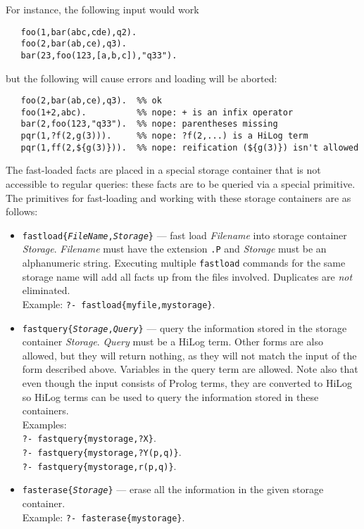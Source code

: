 For instance, the following input would work
\begin{verbatim}
   foo(1,bar(abc,cde),q2).
   foo(2,bar(ab,ce),q3).
   bar(23,foo(123,[a,b,c]),"q33").
\end{verbatim}
but the following will cause errors and loading will be aborted:
\begin{verbatim}
   foo(2,bar(ab,ce),q3).  %% ok
   foo(1+2,abc).          %% nope: + is an infix operator
   bar(2,foo(123,"q33").  %% nope: parentheses missing
   pqr(1,?f(2,g(3))).     %% nope: ?f(2,...) is a HiLog term
   pqr(1,ff(2,${g(3)})).  %% nope: reification (${g(3)}) isn't allowed
\end{verbatim}
The fast-loaded facts are placed in a special storage container that is not
accessible to regular queries: these facts are to be queried via a special
primitive. The primitives for fast-loading and working with these storage
containers are as follows:
\begin{itemize}
\item  \texttt{fastload\{{\it FileName\/},{\it Storage\/}\}} --- fast load
  \emph{Filename} into storage container \emph{Storage}. \emph{Filename}
  must have the extension \texttt{.P} and
  \emph{Storage} must be an alphanumeric string.
  Executing multiple \texttt{fastload} commands for the same storage name
  will add all facts up from the files involved.
  Duplicates are \emph{not} eliminated.
  \\
  Example: \texttt{?- fastload\{myfile,mystorage\}}. 
\item \texttt{fastquery\{{\it Storage\/},{\it Query\/}\}} --- query    
  the information stored in the storage container \emph{Storage}.
  \emph{Query} must be a HiLog term. Other forms are also allowed, but
  they will return nothing, as they will not match the input of the form
  described above. Variables in the query term are allowed.
  Note also that even though the input consists of Prolog terms, they are
  converted to HiLog so HiLog terms can be used to query the information
  stored in these containers.
  \\
  Examples:\\
  \hspace*{5mm}\texttt{?- fastquery\{mystorage,?X\}}. \\
  \hspace*{5mm}\texttt{?- fastquery\{mystorage,?Y(p,q)\}}. \\
  \hspace*{5mm}\texttt{?- fastquery\{mystorage,r(p,q)\}}.
\item \texttt{fasterase\{{\it Storage\/}\}} --- erase all the information
  in the given storage container.   
  \\
  Example: \texttt{?- fasterase\{mystorage\}}. 
\end{itemize}

